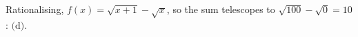 Rationalising, $f(x)=\sqrt{x+1}-\sqrt x$, so the sum telescopes to $\sqrt{100}-\sqrt0=10$: $\boxed{\text{(d)}}$.
